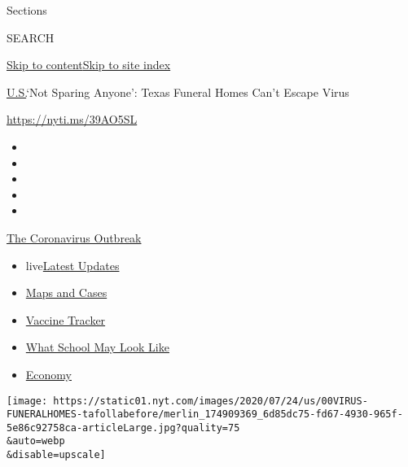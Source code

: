 Sections

SEARCH

\protect\hyperlink{site-content}{Skip to
content}\protect\hyperlink{site-index}{Skip to site index}

\href{/section/us}{U.S.}\textbar{}`Not Sparing Anyone': Texas Funeral
Homes Can't Escape Virus

\url{https://nyti.ms/39AO5SL}

\begin{itemize}
\item
\item
\item
\item
\item
\end{itemize}

\href{https://www.nytimes.com/news-event/coronavirus?action=click\&pgtype=Article\&state=default\&region=TOP_BANNER\&context=storylines_menu}{The
Coronavirus Outbreak}

\begin{itemize}
\tightlist
\item
  live\href{https://www.nytimes.com/2020/08/01/world/coronavirus-covid-19.html?action=click\&pgtype=Article\&state=default\&region=TOP_BANNER\&context=storylines_menu}{Latest
  Updates}
\item
  \href{https://www.nytimes.com/interactive/2020/us/coronavirus-us-cases.html?action=click\&pgtype=Article\&state=default\&region=TOP_BANNER\&context=storylines_menu}{Maps
  and Cases}
\item
  \href{https://www.nytimes.com/interactive/2020/science/coronavirus-vaccine-tracker.html?action=click\&pgtype=Article\&state=default\&region=TOP_BANNER\&context=storylines_menu}{Vaccine
  Tracker}
\item
  \href{https://www.nytimes.com/interactive/2020/07/29/us/schools-reopening-coronavirus.html?action=click\&pgtype=Article\&state=default\&region=TOP_BANNER\&context=storylines_menu}{What
  School May Look Like}
\item
  \href{https://www.nytimes.com/live/2020/07/31/business/stock-market-today-coronavirus?action=click\&pgtype=Article\&state=default\&region=TOP_BANNER\&context=storylines_menu}{Economy}
\end{itemize}

\texttt{[image: https://static01.nyt.com/images/2020/07/24/us/00VIRUS-FUNERALHOMES-tafollabefore/merlin\_174909369\_6d85dc75-fd67-4930-965f-5e86c92758ca-articleLarge.jpg?quality=75\\\&auto=webp\\\&disable=upscale]}

